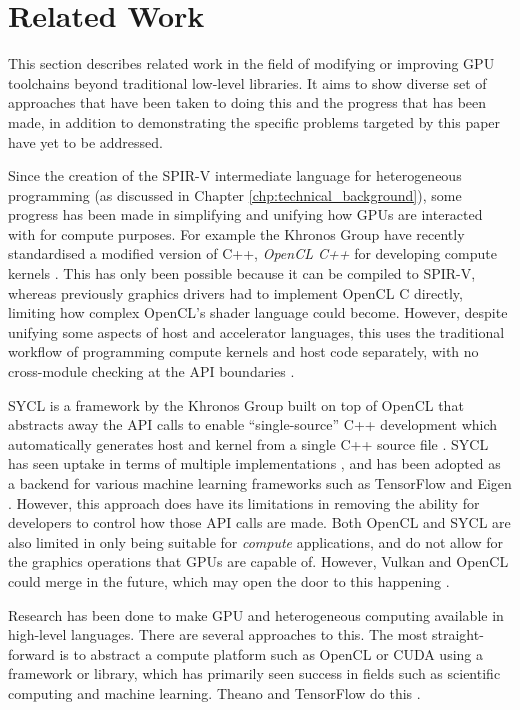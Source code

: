 \documentclass[a4paper,12pt,twoside,openright]{report}
\begin{document}
\section{Related Work}

\label{sec:related_work}

This section describes related work in the field of modifying or improving GPU
toolchains beyond traditional low-level libraries. It aims to show diverse set
of approaches that have been taken to doing this and the progress that has been
made, in addition to demonstrating the specific problems targeted by this paper
have yet to be addressed.

Since the creation of the SPIR-V intermediate language for heterogeneous
programming (as discussed in Chapter \ref{chp:technical_background}), some
progress has been made in simplifying and unifying how GPUs are interacted with
for compute purposes. For example the Khronos Group have recently standardised
a modified version of C++, \textit{OpenCL C++} for developing compute kernels
\cite{OpenCL22Release} \cite{OpenCLCPPWhitePaper} \cite{OpenCL}. This has only
been possible because it can be compiled to SPIR-V, whereas previously graphics
drivers had to implement OpenCL C directly, limiting how complex OpenCL's
shader language could become. However, despite unifying some aspects of host
and accelerator languages, this uses the traditional workflow of programming
compute kernels and host code separately, with no cross-module checking at the
API boundaries \cite{OpenCL22Release}.

SYCL is a framework by the Khronos Group built on top of OpenCL that abstracts
away the API calls to enable ``single-source'' C++ development which
automatically generates host and kernel from a single C++ source file
\cite{OpenCL22Release} \cite{SYCL}. SYCL has seen uptake in terms of multiple
implementations \cite{ComputeCPP} \cite{triSYCL}, and has been adopted as a
backend for various machine learning frameworks such as TensorFlow and Eigen
\cite{SYCLTensorFlow} \cite{SYCLEigen}. However, this approach does have its
limitations in removing the ability for developers to control how those API
calls are made. Both OpenCL and SYCL are also limited in only being suitable
for \textit{compute} applications, and do not allow for the graphics operations
that GPUs are capable of. However, Vulkan and OpenCL could merge in the future,
which may open the door to this happening \cite{VulkanOpenCLMerge}.

Research has been done to make GPU and heterogeneous computing available in
high-level languages. There are several approaches to this. The most
straight-forward is to abstract a compute platform such as OpenCL or CUDA using
a framework or library, which has primarily seen success in fields such as
scientific computing and machine learning. Theano and TensorFlow do this
\cite{Theano2016} \cite{TensorFlowWhitePaper}.
\end{document}
